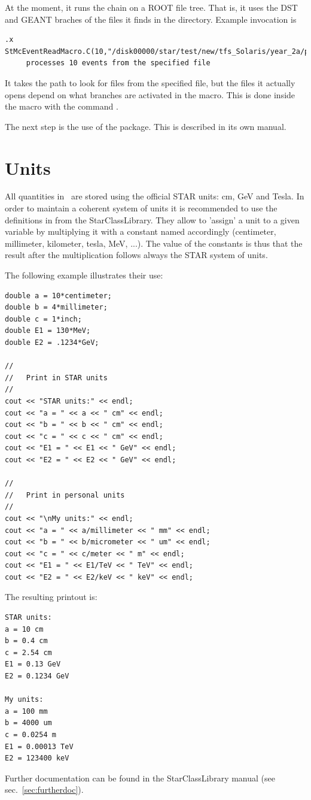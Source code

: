 
At the moment, it runs the chain on a ROOT file tree.  That is, it uses the DST
and GEANT braches of the files it finds in the directory.  Example invocation
is 
\begin{verbatim}
.x StMcEventReadMacro.C(10,"/disk00000/star/test/new/tfs_Solaris/year_2a/psc0210_01_40evts.geant.root")
     processes 10 events from the specified file

\end{verbatim}
It takes the path to look for files from the specified file, but the files it actually opens depend on
what branches are activated in the macro.  This is done inside the macro with the command .

The next step is the use of the \StAssociationMaker package.  This is described
in its own manual.


\section{Units}
 
\label{sec:units}

All quantities in \StMcEvent\ are stored using the official STAR units:
cm, GeV and Tesla.  In order to maintain a coherent system of units it
is recommended to use the definitions in  from
the StarClassLibrary. They allow to 'assign' a unit to a given
variable by multiplying it with a constant named accordingly
(centimeter, millimeter, kilometer, tesla, MeV, ...).  The value of
the constants is thus that the result after the multiplication follows
always the STAR system of units.

The following example illustrates their use:
{\footnotesize
\begin{verbatim}
double a = 10*centimeter;
double b = 4*millimeter;
double c = 1*inch;
double E1 = 130*MeV;
double E2 = .1234*GeV;

//
//   Print in STAR units
//
cout << "STAR units:" << endl;
cout << "a = " << a << " cm" << endl;
cout << "b = " << b << " cm" << endl;
cout << "c = " << c << " cm" << endl;
cout << "E1 = " << E1 << " GeV" << endl;
cout << "E2 = " << E2 << " GeV" << endl;

//
//   Print in personal units
//
cout << "\nMy units:" << endl;
cout << "a = " << a/millimeter << " mm" << endl;
cout << "b = " << b/micrometer << " um" << endl;
cout << "c = " << c/meter << " m" << endl;
cout << "E1 = " << E1/TeV << " TeV" << endl;
cout << "E2 = " << E2/keV << " keV" << endl;
\end{verbatim}
}%
The resulting printout is:
{\footnotesize
\begin{verbatim}
STAR units:
a = 10 cm
b = 0.4 cm
c = 2.54 cm
E1 = 0.13 GeV
E2 = 0.1234 GeV

My units:
a = 100 mm
b = 4000 um
c = 0.0254 m
E1 = 0.00013 TeV
E2 = 123400 keV
\end{verbatim}
}%
Further documentation can be found in the StarClassLibrary manual
(see sec.~\ref{sec:furtherdoc}).

